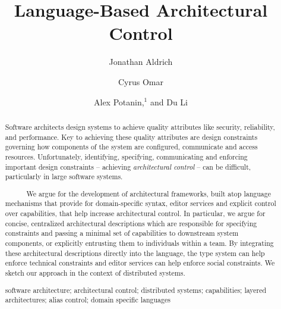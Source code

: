 \documentclass[runningheads]{llncs}
\newcommand{\keywords}[1]{\par\addvspace\baselineskip
\noindent\keywordname\enspace\ignorespaces#1}
\begin{document}
\title{Language-Based Architectural Control}
\author{Jonathan Aldrich \and Cyrus Omar \and Alex Potanin,$^{1}$ and Du Li}
\setlength{\abovecaptionskip}{0pt}
\setlength{\belowcaptionskip}{0pt}

\maketitle

\begin{sloppypar}
\begin{abstract}
Software architects design systems to achieve quality attributes like security, reliability, and performance. Key to achieving these quality attributes are design constraints governing how components of the system  are configured, communicate and access resources. Unfortunately, identifying, specifying, communicating and enforcing important design  constraints -- achieving \emph{architectural control} -- can be difficult, particularly in large software systems.

~~~~~~We argue for the development of architectural frameworks, built atop language mechanisms that provide for  domain-specific syntax, editor services and explicit control over capabilities, that help increase architectural control. In particular, we argue for concise, centralized architectural descriptions which are responsible for specifying constraints and passing a minimal set of capabilities to downstream system components, or explicitly entrusting them to individuals within a team. By integrating these architectural descriptions directly into the language, the type system can help enforce technical constraints and editor services can help enforce social constraints. We sketch our approach in the context of distributed systems.

\keywords{software architecture;
architectural control;
distributed systems;
capabilities;
layered architectures;
alias control;
domain specific languages}

\end{abstract}


\end{sloppypar}
\end{document}
